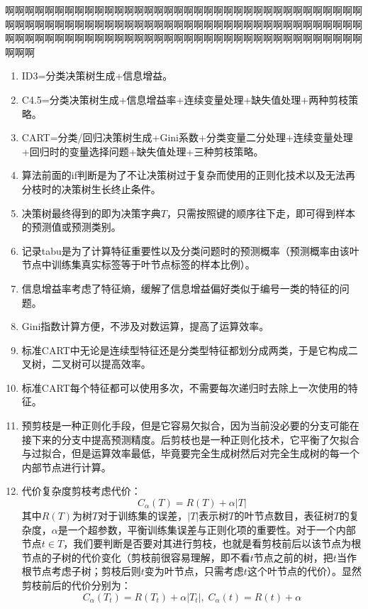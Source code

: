 啊啊啊啊啊啊啊啊啊啊啊啊啊啊啊啊啊啊啊啊啊啊啊啊啊啊啊啊啊啊啊啊啊啊啊啊啊啊啊啊啊啊啊啊啊啊啊啊啊啊啊啊啊啊啊啊啊啊啊啊啊啊啊啊啊啊啊啊啊啊啊啊啊啊啊啊啊啊啊啊啊啊啊啊啊啊啊啊啊啊啊啊啊啊啊啊啊啊啊啊啊啊啊啊啊啊啊啊啊啊啊
\begin{enumerate}
	\item ID3=分类决策树生成+信息增益。
	\item C4.5=分类决策树生成+信息增益率+连续变量处理+缺失值处理+两种剪枝策略。
	\item CART=分类/回归决策树生成+Gini系数+分类变量二分处理+连续变量处理+回归时的变量选择问题+缺失值处理+三种剪枝策略。
	\item 算法前面的if判断是为了不让决策树过于复杂而使用的正则化技术以及无法再分枝时的决策树生长终止条件。
	\item 决策树最终得到的即为决策字典$T$，只需按照键的顺序往下走，即可得到样本的预测值或预测类别。
	\item 记录tabu是为了计算特征重要性以及分类问题时的预测概率（预测概率由该叶节点中训练集真实标签等于叶节点标签的样本比例）。
	\item 信息增益率考虑了特征熵，缓解了信息增益偏好类似于编号一类的特征的问题。
	\item Gini指数计算方便，不涉及对数运算，提高了运算效率。
	\item 标准CART中无论是连续型特征还是分类型特征都划分成两类，于是它构成二叉树，二叉树可以提高效率。
	\item 标准CART每个特征都可以使用多次，不需要每次递归时去除上一次使用的特征。
	\item 预剪枝是一种正则化手段，但是它容易欠拟合，因为当前没必要的分支可能在接下来的分支中提高预测精度。后剪枝也是一种正则化技术，它平衡了欠拟合与过拟合，但是运算效率最低，毕竟要完全生成树然后对完全生成树的每一个内部节点进行计算。
	\item 代价复杂度剪枝考虑代价：
	\begin{equation*}
		C_\alpha(T)=R(T)+\alpha|T|
	\end{equation*}
	其中$R(T)$为树$T$对于训练集的误差，$|T|$表示树$T$的叶节点数目，表征树$T$的复杂度，$\alpha$是一个超参数，平衡训练集误差与正则化项的重要性。对于一个内部节点$t\in T$，我们要判断是否要对其进行剪枝，也就是看剪枝前后以该节点为根节点的子树的代价变化（剪枝前很容易理解，即不看$t$节点之前的树，把$t$当作根节点考虑子树；剪枝后则$t$变为叶节点，只需考虑$t$这个叶节点的代价）。显然剪枝前后的代价分别为：
	\begin{equation*}
		C_\alpha(T_t)=R(T_t)+\alpha|T_t|,\;C_\alpha(t)=R(t)+\alpha
	\end{equation*}

\end{enumerate}
